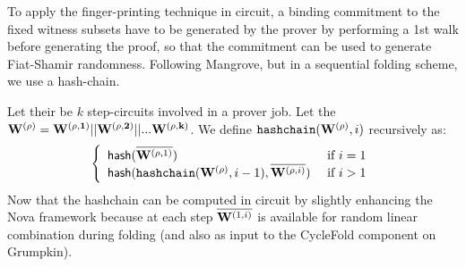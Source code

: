 % 
To apply the finger-printing technique in circuit,
a binding commitment to the fixed witness subsets have to be
generated by the prover by performing a 1st walk before generating
the proof, so that the commitment can be used to generate Fiat-Shamir
randomness. Following Mangrove, but in a sequential folding scheme,
we use a hash-chain.

Let their be $k$ step-circuits involved in a prover job.
Let the ${{\mathbf {W^{(\rho)}}}} = 
	{{\mathbf {W^{(\rho,1)}}}} ||
	{{\mathbf {W^{(\rho,2)}}}} || ...
	{{\mathbf {W^{(\rho,k)}}}}$.
We define $\texttt{hashchain}({{\mathbf {W^{(\rho)}}}}, i)$ recursively as:
\[
	\left\{
		\begin{array}{l l}
			\mathsf{hash}(\overline{{{\mathbf {W}}}^{(\rho,1)}}) & \textrm{ if } i=1 \\
			\mathsf{hash}( \texttt{hashchain}({{\mathbf {W^{(\rho)}}}}, i-1), 
				\overline{{{\mathbf {W}}}^{(\rho,i)}})  & \textrm{ if } i>1 \\
		\end{array}
	\right.
\]
Now that the hashchain can be computed in circuit by slightly
enhancing the Nova framework because
at each step $\overline{{{\mathbf {W}}}^{(1,i)}}$ is available
for random linear combination during folding (and also
as input to the CycleFold component on Grumpkin).


